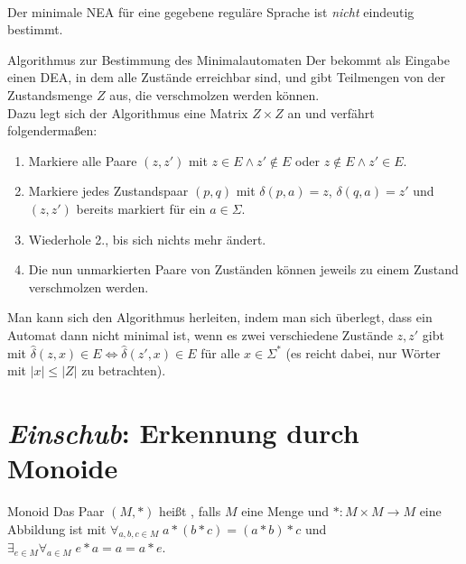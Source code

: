 \begin{Bem}\\
    Der minimale NEA für eine gegebene reguläre Sprache ist \emph{nicht}
    eindeutig bestimmt.
\end{Bem}

\linie

\begin{Def}{Algorithmus zur Bestimmung des Minimalautomaten}
    Der  bekommt
    als Eingabe einen DEA, in dem alle Zustände erreichbar sind, und
    gibt Teilmengen von der Zustandsmenge $Z$ aus, die verschmolzen werden
    können.\\
    Dazu legt sich der Algorithmus eine Matrix $Z \times Z$ an und
    verfährt folgendermaßen:
    \begin{enumerate}
        \item
        Markiere alle Paare $(z, z')$ mit $z \in E \land z' \notin E$ oder
        $z \notin E \land z' \in E$.

        \item
        Markiere jedes Zustandspaar $(p, q)$ mit $\delta(p, a) = z$,
        $\delta(q, a) = z'$ und $(z, z')$ bereits markiert für ein
        $a \in \Sigma$.

        \item
        Wiederhole 2., bis sich nichts mehr ändert.

        \item
        Die nun unmarkierten Paare von Zuständen können jeweils zu einem
        Zustand verschmolzen werden.
    \end{enumerate}
\end{Def}

\begin{Bem}
    Man kann sich den Algorithmus herleiten, indem man sich überlegt, dass
    ein Automat dann nicht minimal ist, wenn es zwei verschiedene Zustände
    $z, z'$ gibt mit $\widehat{\delta}(z, x) \in E \iff
    \widehat{\delta}(z', x) \in E$ für alle $x \in \Sigma^\ast$
    (es reicht dabei, nur Wörter mit $|x| \le |Z|$ zu betrachten).
\end{Bem}

\pagebreak

\section{%
    \emph{Einschub}: Erkennung durch Monoide%
}

\begin{Def}{Monoid}
    Das Paar $(M, \ast)$ heißt , falls
    $M$ eine Menge und
    $\ast\colon M \times M \rightarrow M$ eine Abbildung ist mit
    $\forall_{a, b, c \in M}\;
    a \ast (b \ast c) = (a \ast b) \ast c$ und
    $\exists_{e \in M} \forall_{a \in M}\; e \ast a = a = a \ast e$.
\end{Def}

